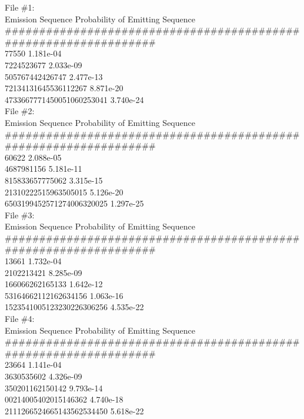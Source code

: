 \begin{solution}
  File \#1:\\
  Emission Sequence             Probability of Emitting Sequence\\
  \footnotesize \#\#\#\#\#\#\#\#\#\#\#\#\#\#\#\#\#\#\#\#\#\#\#\#\#\#\#\#\#\#\#\#\#\#\#\#\#\#\#\#\#\#\#\#\#\#\#\#\#\#\#\#\#\#\#\#\#\#\#\#\#\#\#\#\#\\
  77550                         1.181e-04 \\
  7224523677                    2.033e-09 \\
  505767442426747               2.477e-13 \\
  72134131645536112267          8.871e-20 \\
  4733667771450051060253041     3.740e-24 \\
  
  File \#2:\\
  Emission Sequence             Probability of Emitting Sequence\\
  \footnotesize \#\#\#\#\#\#\#\#\#\#\#\#\#\#\#\#\#\#\#\#\#\#\#\#\#\#\#\#\#\#\#\#\#\#\#\#\#\#\#\#\#\#\#\#\#\#\#\#\#\#\#\#\#\#\#\#\#\#\#\#\#\#\#\#\#\\
  60622                         2.088e-05 \\
  4687981156                    5.181e-11 \\
  815833657775062               3.315e-15 \\
  21310222515963505015          5.126e-20 \\
  6503199452571274006320025     1.297e-25 \\
  
  File \#3:\\
  Emission Sequence             Probability of Emitting Sequence\\
  \footnotesize \#\#\#\#\#\#\#\#\#\#\#\#\#\#\#\#\#\#\#\#\#\#\#\#\#\#\#\#\#\#\#\#\#\#\#\#\#\#\#\#\#\#\#\#\#\#\#\#\#\#\#\#\#\#\#\#\#\#\#\#\#\#\#\#\#\\
  13661                         1.732e-04 \\
  2102213421                    8.285e-09 \\
  166066262165133               1.642e-12 \\
  53164662112162634156          1.063e-16 \\
  1523541005123230226306256     4.535e-22 \\
  
  File \#4:\\
  Emission Sequence             Probability of Emitting Sequence\\
  \footnotesize \#\#\#\#\#\#\#\#\#\#\#\#\#\#\#\#\#\#\#\#\#\#\#\#\#\#\#\#\#\#\#\#\#\#\#\#\#\#\#\#\#\#\#\#\#\#\#\#\#\#\#\#\#\#\#\#\#\#\#\#\#\#\#\#\#\\
  23664                         1.141e-04 \\
  3630535602                    4.326e-09 \\
  350201162150142               9.793e-14 \\
  00214005402015146362          4.740e-18 \\
  2111266524665143562534450     5.618e-22 \\
  

\end{solution}
